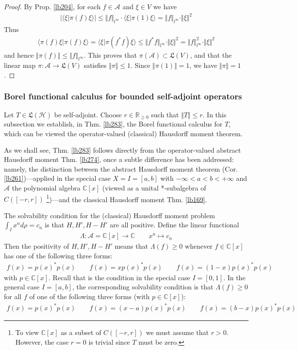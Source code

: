 \documentclass[12pt,b5paper,notitlepage]{article}
\theoremstyle{definition}
\theoremstyle{plain}
\newcommand{\fk}{\mathfrak}
\newcommand{\bk}[1]{\langle {#1}\rangle}
\newcommand{\scr}{\mathscr}
\newcommand{\Cbb}{\mathbb C}
\newcommand{\Rbb}{\mathbb R}
\newcommand{\MH}{\mathcal H}
\newcommand{\SA}{\mathscr A}
\numberwithin{equation}{section}
\begin{document}
\begin{proof}
By Prop. \ref{lb204}, for each $f\in\scr A$ and $\xi\in V$ we have
\begin{align*}
|\bk{\xi|\pi(f)\xi}|\leq \Vert f\Vert_{l^\infty}\cdot\bk{\xi|\pi(1)\xi}=\Vert f\Vert_{l^\infty}\cdot \Vert\xi\Vert^2
\end{align*}
Thus
\begin{align*}
\bk{\pi(f)\xi|\pi(f)\xi}=\bk{\xi|\pi(f^*f)\xi}\leq \Vert f^*f\Vert_{l^\infty}\cdot \Vert\xi\Vert^2=\Vert f\Vert_{l^\infty}^2\cdot\Vert\xi\Vert^2
\end{align*}
and hence $\Vert\pi(f)\Vert\leq\Vert f\Vert_{l^\infty}$. This proves that $\pi(\SA)\subset\fk L(V)$, and that the linear map $\pi:\SA\rightarrow\fk L(V)$ satisfies $\Vert\pi\Vert\leq1$. Since $\Vert\pi(1)\Vert=1$, we have $\Vert\pi\Vert=1$.
\end{proof}



\subsubsection{Borel functional calculus for bounded self-adjoint operators}



Let $T\in\fk L(\MH)$ be self-adjoint. Choose $r\in\Rbb_{\geq0}$ such that $\Vert T\Vert\leq r$. In this subsection we establish, in Thm. \ref{lb283}, the Borel functional calculus for $T$, which can be viewed the operator-valued (classical) Hausdorff moment theorem.

As we shall see, Thm. \ref{lb283} follows directly from the operator-valued abstract Hausdorff moment Thm. \ref{lb274}, once a subtle difference has been addressed: namely, the distinction between the abstract Hausdorff moment theorem (Cor. \ref{lb261})---applied in the special case $X=I=[a,b]$ with $-\infty<a<b<+\infty$ and $\scr A$ the polynomial algebra $\Cbb[x]$ (viewed as a unital *-subalgebra of $C([-r,r])$ \footnote{To view $\Cbb[x]$ as a subset of $C([-r,r])$ we must assume that $r>0$. However, the case $r=0$ is trivial since $T$ must be zero.})---and the classical Hausdorff moment Thm. \ref{lb169}.


The solvability condition for the (classical) Hausdorff moment problem $\int_I x^nd\rho=c_n$ is that $H,H',H-H'$ are all positive. Define the linear functional
\begin{align*}
\Lambda:\scr A=\Cbb[x]\rightarrow\Cbb\qquad x^n\mapsto c_n
\end{align*}
Then the positivity of $H,H',H-H'$ means that $\Lambda(f)\geq0$ whenever $f\in\Cbb[x]$ has one of the following three forms:
\begin{align*}
f(x)=p(x)^*p(x)\qquad f(x)=xp(x)^*p(x)\qquad f(x)=(1-x)p(x)^*p(x)
\end{align*}
with $p\in\Cbb[x]$. Recall that is the condition in the special case $I=[0,1]$. In the general case $I=[a,b]$, the corresponding solvability condition is that $\Lambda(f)\geq0$ for all $f$ of one of the following three forms (with $p\in\Cbb[x]$):
\begin{align}\label{eq160}
f(x)=p(x)^*p(x)\qquad f(x)=(x-a)p(x)^*p(x)\qquad f(x)=(b-x)p(x)^*p(x)
\end{align}
\end{document}
